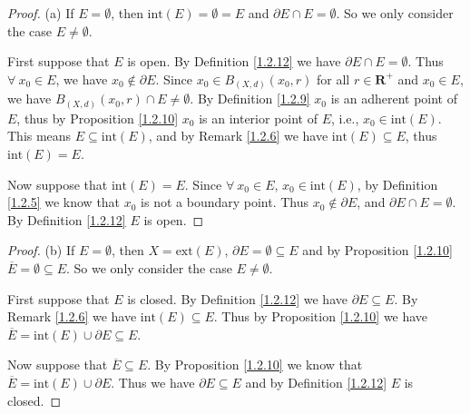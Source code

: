 \begin{proof}{(a)}
    If \(E = \emptyset\), then \(\text{int}(E) = \emptyset = E\) and \(\partial E \cap E = \emptyset\).
    So we only consider the case \(E \neq \emptyset\).

    First suppose that \(E\) is open.
    By Definition \ref{1.2.12} we have \(\partial E \cap E = \emptyset\).
    Thus \(\forall\ x_0 \in E\), we have \(x_0 \notin \partial E\).
    Since \(x_0 \in B_{(X, d)}(x_0, r)\) for all \(r \in \mathbf{R}^+\) and \(x_0 \in E\), we have \(B_{(X, d)}(x_0, r) \cap E \neq \emptyset\).
    By Definition \ref{1.2.9} \(x_0\) is an adherent point of \(E\), thus by Proposition \ref{1.2.10} \(x_0\) is an interior point of \(E\), i.e., \(x_0 \in \text{int}(E)\).
    This means \(E \subseteq \text{int}(E)\), and by Remark \ref{1.2.6} we have \(\text{int}(E) \subseteq E\), thus \(\text{int}(E) = E\).

    Now suppose that \(\text{int}(E) = E\).
    Since \(\forall\ x_0 \in E\), \(x_0 \in \text{int}(E)\), by Definition \ref{1.2.5} we know that \(x_0\) is not a boundary point.
    Thus \(x_0 \notin \partial E\), and \(\partial E \cap E = \emptyset\).
    By Definition \ref{1.2.12} \(E\) is open.
\end{proof}

\begin{proof}{(b)}
    If \(E = \emptyset\), then \(X = \text{ext}(E)\), \(\partial E = \emptyset \subseteq E\) and by Proposition \ref{1.2.10} \(\overline{E} = \emptyset \subseteq E\).
    So we only consider the case \(E \neq \emptyset\).

    First suppose that \(E\) is closed.
    By Definition \ref{1.2.12} we have \(\partial E \subseteq E\).
    By Remark \ref{1.2.6} we have \(\text{int}(E) \subseteq E\).
    Thus by Proposition \ref{1.2.10} we have \(\overline{E} = \text{int}(E) \cup \partial E \subseteq E\).

    Now suppose that \(\overline{E} \subseteq E\).
    By Proposition \ref{1.2.10} we know that \(\overline{E} = \text{int}(E) \cup \partial E\).
    Thus we have \(\partial E \subseteq E\) and by Definition \ref{1.2.12} \(E\) is closed.
\end{proof}
